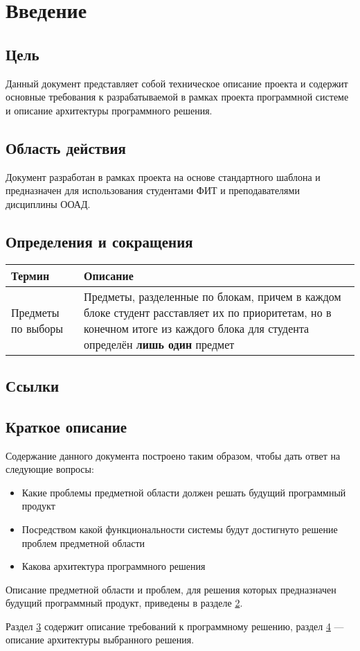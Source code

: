 \chapter{Введение}
	\label{chapter1}

	\section{Цель}
		Данный документ представляет собой техническое описание проекта \ProjectName и содержит основные требования к разрабатываемой в рамках проекта программной системе и описание архитектуры программного решения.
	\section{Область действия}
		Документ разработан в рамках проекта \ProjectName на основе стандартного шаблона и предназначен для использования студентами ФИТ и преподавателями дисциплины ООАД.
	\section{Определения и сокращения}
		\begin{tabularx}{\textwidth}{
				| >{\centering\arraybackslash\hsize=5cm}X
				| >{\centering\arraybackslash}X
				|}\hline
			\textbf{Термин} & \textbf{Описание} \\\hline
			Предметы по выборы & Предметы, разделенные по блокам, причем в каждом блоке студент расставляет их по приоритетам, но в конечном итоге из каждого блока для студента определён \textbf{лишь один} предмет \\\hline
		\end{tabularx}
	\section{Ссылки}

	\section{Краткое описание}
		Содержание данного документа построено таким образом, чтобы дать ответ на следующие вопросы:
		\begin{itemize}
			\item Какие проблемы предметной области должен решать будущий программный продукт
			
			\item Посредством какой функциональности системы будут достигнуто решение проблем предметной области
			
			\item Какова архитектура программного решения
		\end{itemize}
	
		Описание предметной области и проблем, для решения которых предназначен будущий программный продукт, приведены в разделе \hyperref[chapter2]{2}.
	
		\bigskip
		
		Раздел \hyperref[chapter3]{3} содержит описание требований к программному решению, раздел \hyperref[chapter4]{4} --- описание архитектуры выбранного решения.
		